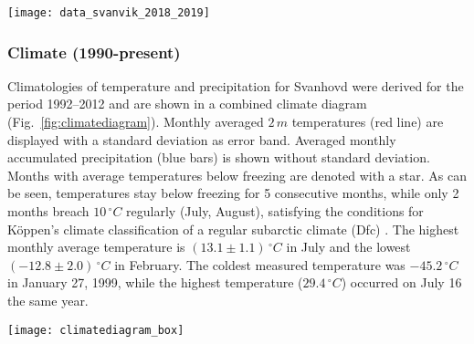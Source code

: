 \documentclass[bg, manuscript]{copernicus}
\begin{document}
\begin{figure*}[t]
  \texttt{[image: data\_svanvik\_2018\_2019]}
  \caption{Observational data from atmospheric monitoring at Svanhovd in 2018/19. The hatched areas indicate periods without ozone monitoring data. (a) Hourly averaged ozone VMR; (b) hourly averaged temperature; (c) daily accumulated precipitation; (d) hourly averaged global irradiance.}
  \label{fig:data_svanvik_2018_2019}
\end{figure*}


\subsubsection{Climate (1990-present)}
\label{subsec:climatologies}

Climatologies of temperature and precipitation for Svanhovd were derived for the period 1992--2012 and are shown in a combined climate diagram (Fig.~\ref{fig:climatediagram}). Monthly averaged $2\,\unit{m}$ temperatures (red line) are displayed with a standard deviation as error band. Averaged monthly accumulated precipitation (blue bars) is shown without standard deviation. Months with average temperatures below freezing are denoted with a star. As can be seen, temperatures stay below freezing for 5 consecutive months, while only 2 months breach $10\,\unit{^\circ C}$ regularly (July, August), satisfying the conditions for K\"{o}ppen's climate classification of a regular subarctic climate (Dfc) \citep[e.g.][]{SD:Beck2018}. The highest monthly average temperature is $(13.1\pm 1.1)\,\unit{^\circ C}$ in July and the lowest $(-12.8\pm 2.0)\,\unit{^\circ C}$ in February. The coldest measured temperature was $-45.2\,\unit{^\circ C}$ in January 27, 1999, while the highest temperature ($29.4\,\unit{^\circ C}$) occurred on July 16 the same year.

\begin{figure*}[t]
  \texttt{[image: climatediagram\_box]}
  \caption{Climate diagram based on meteorological data for Svanvik/Pasvik (1992--2012). Ozone climatology based on ozone monitoring data at NIBIO Environment Centre Svanhovd(1986--2003). A box indicates the upper/lower quartile, whiskers the $1.5\times$ Interquartile Range (IQR), and circles outliers. The median is marked by a colored horizontal line and the mean by a triangle. Notches indicate the confidence interval around the median. (a) Temperature; (b) accumulated precipitation; (c) radiant energy; (d) ozone VMR}
  \label{fig:climatediagram}
\end{figure*}
\end{document}
